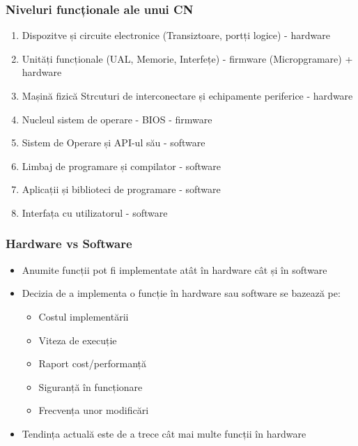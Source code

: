 \begin{frame}
    \frametitle{Niveluri funcționale ale unui CN}
\begin{enumerate}
    \item Dispozitve și circuite electronice (Transiztoare, portți logice) - hardware
    \item Unități funcționale (UAL, Memorie, Interfețe) - firmware (Micropgramare) + hardware
    \item Mașină fizică Strcuturi de interconectare și echipamente periferice - hardware
    \item Nucleul sistem de operare - BIOS - firmware
    \item Sistem de Operare și API-ul său - software
    \item Limbaj de programare și compilator - software
    \item Aplicații și biblioteci de programare - software
    \item Interfața cu utilizatorul - software
\end{enumerate}

\end{frame}

\begin{frame}
    \frametitle{Hardware vs Software}
\begin{itemize}
    \item Anumite funcții pot fi implementate atât în hardware cât și în software
    \item Decizia de a implementa o funcție în hardware sau software se bazează pe:
    \begin{itemize}
        \item Costul implementării
        \item Viteza de execuție
        \item Raport cost/performanță
        \item Siguranță în funcționare
        \item Frecvența unor modificări
    \end{itemize}
    \item Tendința actuală este de a trece cât mai multe funcții în hardware
\end{itemize}

\end{frame}